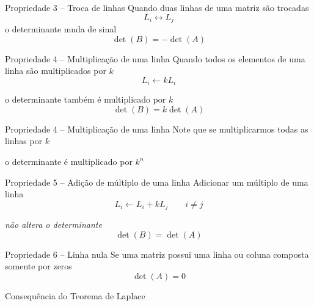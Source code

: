 \documentclass[fleqn,aspectratio=169,12pt]{beamer}
\begin{document}
\begin{frame}{Propriedade 3 -- Troca de linhas}
  Quando duas linhas de uma matriz são trocadas
  \[
    L_i \leftrightarrow L_j
  \]
  o determinante muda de sinal
  \[
  \det(B) = -\det(A)
  \]
\end{frame}



\begin{frame}{Propriedade 4 -- Multiplicação de uma linha}
  Quando todos os elementos de uma linha são multiplicados por $k$
  \pause
  \[
    L_i \leftarrow k L_i
  \]

  \pause
  o determinante também é multiplicado por $k$
  \pause
  \[
    \det(B) = k\det(A)
  \]
\end{frame}

\begin{frame}{Propriedade 4 -- Multiplicação de uma linha}
  Note que se multiplicarmos todas as linhas por $k$

  \pause
  o determinante é multiplicado por $k^n$
\end{frame}



\begin{frame}{Propriedade 5 -- Adição de múltiplo de uma linha}
  Adicionar um múltiplo de uma linha
  \[
    L_i \leftarrow L_i + k L_j
    \qquad i\neq j
  \]

  \pause
  \emph{não altera o determinante}
  \[
    \det(B) = \det(A)
  \]
\end{frame}



\begin{frame}{Propriedade 6 -- Linha nula}
  Se uma matriz possui uma linha ou coluna composta somente por zeros
  \pause
  \[
    \det(A) = 0
  \]

  \pause
  \bigskip
  Consequência do Teorema de Laplace
\end{frame}
\end{document}
